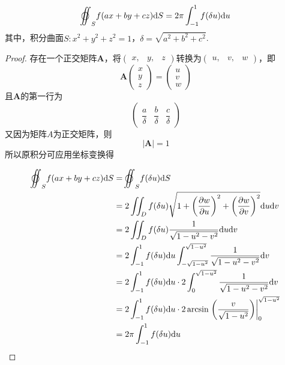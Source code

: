 \begin{theorem}\label{theorem:surface}

    \[\ooint_{S}{f(ax + by + cz)}\diff S = 2\pi\int_{-1}^{1}{f(\delta u)}\diff u\]
    其中，积分曲面$S: x^2 + y^2 + z^2 = 1$，$\delta = \sqrt{a^2 + b^2 + c^2}$.

\end{theorem}

\begin{proof}

    存在一个正交矩阵$\boldsymbol{A}$，将$(\begin{smallmatrix} x, & y, & z \end{smallmatrix})$转换为$(\begin{smallmatrix} u, & v, & w \end{smallmatrix})$，即
    $$ \boldsymbol{A}
    \begin{pmatrix}
        x \\
        y \\
        z
    \end{pmatrix} = 
    \begin{pmatrix}
        u \\
        v \\
        w
    \end{pmatrix}$$
    且$\boldsymbol{A}$的第一行为
    $$\begin{pmatrix}
        \dfrac{a}{\delta} & \dfrac{b}{\delta} & \dfrac{c}{\delta}
    \end{pmatrix}$$
    又因为矩阵$A$为正交矩阵，则
    \[|\boldsymbol{A}| = 1\]
    所以原积分可应用坐标变换得
    
    \begin{align*}
        \ooint_{S}{f(ax + by + cz)}\diff S & = \ooint_{S}{f(\delta u)}\diff S \\
        & = 2\iint_{D}{f(\delta u) \sqrt{1 + \left( \dfrac{\partial w}{\partial u} \right)^2 + \left( \dfrac{\partial w}{\partial v} \right)^2}}\diff u \diff v \\
        & = 2\iint_{D}{f(\delta u) \dfrac{1}{\sqrt{1 - u^2 - v^2}}}\diff u \diff v \\
        & = 2\int_{-1}^{1}{f(\delta u)}\diff u \int_{-\sqrt{1 - u^2}}^{\sqrt{1 - u^2}}{\dfrac{1}{\sqrt{1 - u^2 - v^2}}}\diff v \\
        & = 2\int_{-1}^{1}{f(\delta u)}\diff u \cdot 2 \int_{0}^{\sqrt{1 - u^2}}{\dfrac{1}{\sqrt{1 - u^2 - v^2}}}\diff v \\
        & = 2\int_{-1}^{1}{f(\delta u)}\diff u \cdot 2\arcsin\left. \left( \dfrac{v}{\sqrt{1 - u^2}} \right) \right|_{0}^{\sqrt{1 - u^2}} \\
        & = 2\pi\int_{-1}^{1}{f(\delta u)}\diff u
    \end{align*}

\end{proof}

